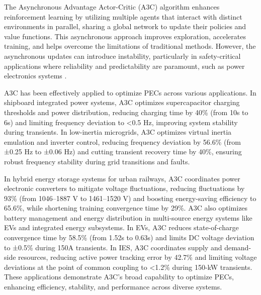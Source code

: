 The Asynchronous Advantage Actor-Critic (A3C) algorithm enhances reinforcement learning by utilizing multiple agents that interact with distinct environments in parallel, sharing a global network to update their policies and value functions. This asynchronous approach improves exploration, accelerates training, and helps overcome the limitations of traditional methods. However, the asynchronous updates can introduce instability, particularly in safety-critical applications where reliability and predictability are paramount, such as power electronics systems \cite{mnih2016asynchronous}.

A3C has been effectively applied to optimize PECs across various applications. In shipboard integrated power systems, A3C optimizes supercapacitor charging thresholds and power distribution, reducing charging time by 40\% (from 10s to 6s) and limiting frequency deviation to <0.5 Hz, improving system stability during transients. In low-inertia microgrids, A3C optimizes virtual inertia emulation and inverter control, reducing frequency deviation by 56.6\% (from ±0.25 Hz to ±0.06 Hz) and cutting transient recovery time by 40\%, ensuring robust frequency stability during grid transitions and faults.

In hybrid energy storage systems for urban railways, A3C coordinates power electronic converters to mitigate voltage fluctuations, reducing fluctuations by 93\% (from 1046–1887 V to 1461–1520 V) and boosting energy-saving efficiency to 65.6\%, while shortening training convergence time by 29\%. A3C also optimizes battery management and energy distribution in multi-source energy systems like EVs and integrated energy subsystems. In EVs, A3C reduces state-of-charge convergence time by 58.5\% (from 1.52s to 0.63s) and limits DC voltage deviation to ±0.5\% during 150A transients. In IES, A3C coordinates supply and demand-side resources, reducing active power tracking error by 42.7\% and limiting voltage deviations at the point of common coupling to <1.2\% during 150-kW transients. These applications demonstrate A3C's broad capability to optimize PECs, enhancing efficiency, stability, and performance across diverse systems.


